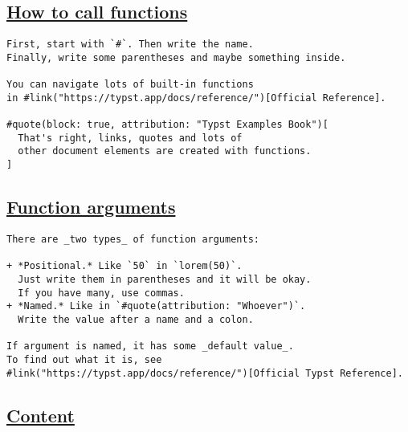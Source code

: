 \pandocbounded{}

\subsection{\texorpdfstring{\hyperref[how-to-call-functions]{How to call
functions}}{How to call functions}}\label{how-to-call-functions}

\begin{verbatim}
First, start with `#`. Then write the name.
Finally, write some parentheses and maybe something inside.

You can navigate lots of built-in functions
in #link("https://typst.app/docs/reference/")[Official Reference].

#quote(block: true, attribution: "Typst Examples Book")[
  That's right, links, quotes and lots of
  other document elements are created with functions.
]
\end{verbatim}

\pandocbounded{}

\subsection{\texorpdfstring{\hyperref[function-arguments]{Function
arguments}}{Function arguments}}\label{function-arguments}

\begin{verbatim}
There are _two types_ of function arguments:

+ *Positional.* Like `50` in `lorem(50)`.
  Just write them in parentheses and it will be okay.
  If you have many, use commas.
+ *Named.* Like in `#quote(attribution: "Whoever")`.
  Write the value after a name and a colon.

If argument is named, it has some _default value_.
To find out what it is, see
#link("https://typst.app/docs/reference/")[Official Typst Reference].
\end{verbatim}

\pandocbounded{}

\subsection{\texorpdfstring{\hyperref[content]{Content}}{Content}}\label{content}

